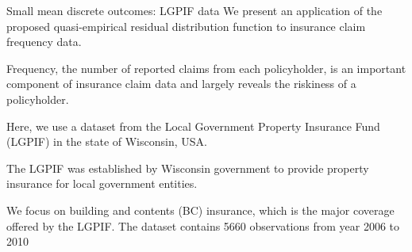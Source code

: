 \documentclass[
  ignorenonframetext,
]{beamer}
\begin{document}
\begin{frame}{Small mean discrete outcomes: LGPIF data}
\protect\hypertarget{small-mean-discrete-outcomes-lgpif-data}{}
We present an application of the proposed quasi-empirical residual
distribution function to insurance claim frequency data.

\vspace{12pt}

Frequency, the number of reported claims from each policyholder, is an
important component of insurance claim data and largely reveals the
riskiness of a policyholder.

\vspace{12pt}

Here, we use a dataset from the Local Government Property Insurance Fund
(LGPIF) in the state of Wisconsin, USA.

\vspace{12pt}

The LGPIF was established by Wisconsin government to provide property
insurance for local government entities.

\vspace{12pt}

We focus on building and contents (BC) insurance, which is the major
coverage offered by the LGPIF. The dataset contains 5660 observations
from year 2006 to 2010
\end{frame}
\end{document}
